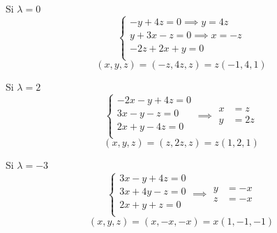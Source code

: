 \documentclass[../practica.root.tex]{subfiles}
\begin{document}
\begin{enumerate}
\[          \]
          \begin{minipage}[t]{0.5\textwidth}
              Si $ \lambda = 0 $
              \[
                  \begin{cases}
                      -y + 4z = 0 \implies y = 4z    \\
                      y + 3x - z = 0 \implies x = -z \\
                      -2z + 2x + y = 0               \\
                  \end{cases}
              \] \[
                  (x, y, z) = (-z,4z,z) = z(-1,4,1)
              \]
          \end{minipage}
          \begin{minipage}[t]{0.5\textwidth}
              Si $ \lambda = 2 $
              \[
                  \begin{cases}
                      -2x - y + 4z = 0 \\
                      3x - y -  z = 0  \\
                      2x + y - 4z = 0  \\
                  \end{cases}
                  \implies
                  \begin{array}{rl}
                      x & = z  \\
                      y & = 2z
                  \end{array}
              \] \[
                  (x, y, z) = (z,2z,z) = z(1,2,1)
              \]
          \end{minipage}
          \begin{minipage}[t]{0.5\textwidth}
              Si $ \lambda = -3 $
              \[
                  \begin{cases}
                      3x -  y + 4z = 0 \\
                      3x + 4y -  z = 0 \\
                      2x +  y +  z = 0 \\
                  \end{cases}
                  \implies
                  \begin{array}{rl}
                      y & = -x \\
                      z & = -x
                  \end{array}
              \] \[
                  (x, y, z) = (x,-x,-x) = x(1,-1,-1)
              \]
          \end{minipage}

\end{enumerate}
\end{document}
